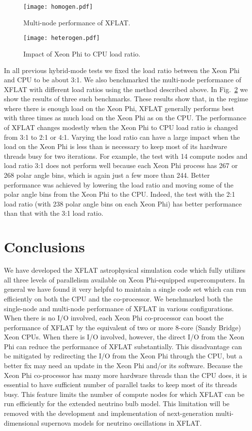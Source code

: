 \documentclass{sig-alternate}
\begin{document}
\begin{figure}[t]
\centering
\texttt{[image: homogen.pdf]}
\caption{Multi-node performance of XFLAT.}
\label{fig:hom}
\end{figure}

\begin{figure}[t]
\centering
\texttt{[image: heterogen.pdf]}
\caption{Impact of Xeon Phi to CPU load ratio.}
\label{fig:het}
\end{figure}

In all previous hybrid-mode tests we fixed the load ratio between the
Xeon Phi and CPU to be about 3:1. We also benchmarked the multi-node performance
of XFLAT  with different load ratios using the
method described above. In Fig.~\ref{fig:het} we show the results of
three such benchmarks. These results show that, in the regime where
there is enough load on the Xeon Phi, XFLAT generally performs best with three times
as much load on the Xeon Phi as on the CPU. The performance of XFLAT changes
modestly when the Xeon Phi to CPU load ratio is changed from 3:1 to 2:1 or
4:1. Varying the load ratio can have a large impact when the load on
the Xeon Phi is less than is necessary to keep most of its hardware
threads busy for two iterations.  
For example, the test with 14 compute nodes and load ratio 3:1 does not
perform well because each Xeon Phi process has 267 or 268 polar angle
bins, which is again just a few more than 244. Better performance was
achieved by lowering the load ratio and
moving some of the polar angle bins from the Xeon Phi to the
CPU. Indeed, the test
with the 2:1 load ratio (with 238 polar angle bins on each Xeon Phi)
has better performance than that with the 3:1 load ratio. 


\section{Conclusions}
We have developed the XFLAT astrophysical simulation
code which fully utilizes all three levels of parallelism available on
Xeon Phi-equipped supercomputers. In general we have found it very helpful
to maintain a single code set which can run efficiently on both the CPU and the
co-processor. 
We benchmarked both the single-node and
multi-node performance of XFLAT in various configurations. 
When there is no I/O involved, each Xeon Phi co-processor can boost
the performance of XFLAT by the equivalent of two or more
8-core (Sandy Bridge) Xeon CPUs.
When there is I/O involved, however, the direct I/O from the Xeon Phi can
reduce the performance of XFLAT substantially. This disadvantage can
be mitigated by redirecting the I/O from the Xeon Phi through the CPU, but a
better fix may need an update in the Xeon Phi and/or its software.
Because the Xeon Phi co-processor has many more hardware threads than the CPU
does, it is essential to have sufficient number of parallel tasks to keep most
of its threads busy. This feature limits the number of compute nodes
for which XFLAT can be run efficiently for the extended neutrino bulb
model. This limitation will be removed with the development and implementation of next-generation multi-dimensional supernova models for neutrino oscillations in XFLAT. 
\end{document}
